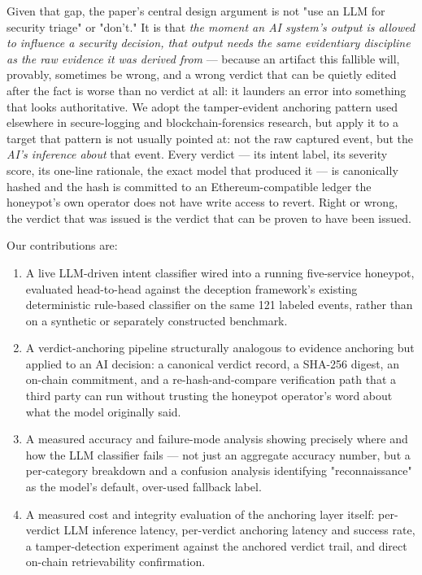\documentclass[journal,10pt,twocolumn]{IEEEtran}
\begin{document}
Given that gap, the paper's central design argument is not "use an LLM for security triage" or "don't." It is that \emph{the moment an AI system's output is allowed to influence a security decision, that output needs the same evidentiary discipline as the raw evidence it was derived from} --- because an artifact this fallible will, provably, sometimes be wrong, and a wrong verdict that can be quietly edited after the fact is worse than no verdict at all: it launders an error into something that looks authoritative. We adopt the tamper-evident anchoring pattern used elsewhere in secure-logging and blockchain-forensics research, but apply it to a target that pattern is not usually pointed at: not the raw captured event, but the \emph{AI's inference about} that event. Every verdict --- its intent label, its severity score, its one-line rationale, the exact model that produced it --- is canonically hashed and the hash is committed to an Ethereum-compatible ledger the honeypot's own operator does not have write access to revert. Right or wrong, the verdict that was issued is the verdict that can be proven to have been issued.

Our contributions are:

\begin{enumerate}
\item A live LLM-driven intent classifier wired into a running five-service honeypot, evaluated head-to-head against the deception framework's existing deterministic rule-based classifier on the same 121 labeled events, rather than on a synthetic or separately constructed benchmark.
\item A verdict-anchoring pipeline structurally analogous to evidence anchoring but applied to an AI decision: a canonical verdict record, a SHA-256 digest, an on-chain commitment, and a re-hash-and-compare verification path that a third party can run without trusting the honeypot operator's word about what the model originally said.
\item A measured accuracy and failure-mode analysis showing precisely where and how the LLM classifier fails --- not just an aggregate accuracy number, but a per-category breakdown and a confusion analysis identifying "reconnaissance" as the model's default, over-used fallback label.
\item A measured cost and integrity evaluation of the anchoring layer itself: per-verdict LLM inference latency, per-verdict anchoring latency and success rate, a tamper-detection experiment against the anchored verdict trail, and direct on-chain retrievability confirmation.
\end{enumerate}
\end{document}
